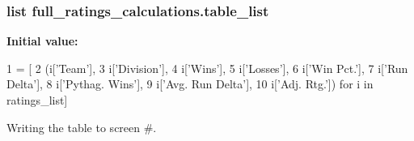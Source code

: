 \subsubsection[{\texorpdfstring{table\+\_\+list}{table_list}}]{\setlength{\rightskip}{0pt plus 5cm}list full\+\_\+ratings\+\_\+calculations.\+table\+\_\+list}\hypertarget{namespacefull__ratings__calculations_aea6fcad67a2966594f87438dc1f03bf7}{}\label{namespacefull__ratings__calculations_aea6fcad67a2966594f87438dc1f03bf7}
{\bfseries Initial value\+:}
\begin{DoxyCode}
1 = [
2     (i[\textcolor{stringliteral}{'Team'}],
3      i[\textcolor{stringliteral}{'Division'}],
4      i[\textcolor{stringliteral}{'Wins'}],
5      i[\textcolor{stringliteral}{'Losses'}],
6      i[\textcolor{stringliteral}{'Win Pct.'}],
7      i[\textcolor{stringliteral}{'Run Delta'}],
8      i[\textcolor{stringliteral}{'Pythag. Wins'}],
9      i[\textcolor{stringliteral}{'Avg. Run Delta'}],
10      i[\textcolor{stringliteral}{'Adj. Rtg.'}]) \textcolor{keywordflow}{for} i \textcolor{keywordflow}{in} ratings\_list]
\end{DoxyCode}


Writing the table to screen \#. 

